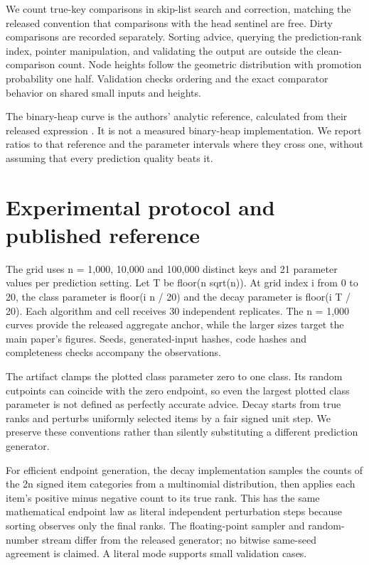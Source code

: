 We count true-key comparisons in skip-list search and correction, matching the released convention that comparisons with the head sentinel are free. Dirty comparisons are recorded separately. Sorting advice, querying the prediction-rank index, pointer manipulation, and validating the output are outside the clean-comparison count. Node heights follow the geometric distribution with promotion probability one half. Validation checks ordering and the exact comparator behavior on shared small inputs and heights.

The binary-heap curve is the authors' analytic reference, calculated from their released expression \cite{ref2}. It is not a measured binary-heap implementation. We report ratios to that reference and the parameter intervals where they cross one, without assuming that every prediction quality beats it.

\section{Experimental protocol and published reference}
The grid uses n = 1,000, 10,000 and 100,000 distinct keys and 21 parameter values per prediction setting. Let T be floor(n sqrt(n)). At grid index i from 0 to 20, the class parameter is floor(i n / 20) and the decay parameter is floor(i T / 20). Each algorithm and cell receives 30 independent replicates. The n = 1,000 curves provide the released aggregate anchor, while the larger sizes target the main paper's figures. Seeds, generated-input hashes, code hashes and completeness checks accompany the observations.

The artifact clamps the plotted class parameter zero to one class. Its random cutpoints can coincide with the zero endpoint, so even the largest plotted class parameter is not defined as perfectly accurate advice. Decay starts from true ranks and perturbs uniformly selected items by a fair signed unit step. We preserve these conventions rather than silently substituting a different prediction generator.

For efficient endpoint generation, the decay implementation samples the counts of the 2n signed item categories from a multinomial distribution, then applies each item's positive minus negative count to its true rank. This has the same mathematical endpoint law as literal independent perturbation steps because sorting observes only the final ranks. The floating-point sampler and random-number stream differ from the released generator; no bitwise same-seed agreement is claimed. A literal mode supports small validation cases.

